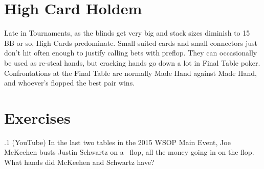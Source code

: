 \section{High Card Holdem}

Late in Tournaments, as the blinds get very big and stack sizes diminish
to 15 BB or so, High Cards predominate. Small suited cards and small
connectors just don't hit often enough to justify calling bets with
preflop. They can occasionally be used as re-steal hands, but cracking
hands go down a lot in Final Table poker. Confrontations at the Final
Table are normally Made Hand against Made Hand, and whoever's flopped
the best pair wins.

\section{Exercises}


.1 (YouTube) In the last two tables in the 2015 WSOP
Main Event, Joe McKeehen busts Justin Schwartz on a
\sixh\tred\twod\ flop, all the money going in on the flop. What hands
did McKeehen and Schwartz have?
